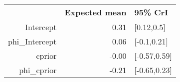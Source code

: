 \begin{tabular}{rrl}
  \hline
 & Expected mean & 95\% CrI \\ 
  \hline
Intercept & 0.31 & [0.12,0.5] \\ 
  phi\_Intercept & 0.06 & [-0.1,0.21] \\ 
  cprior & -0.00 & [-0.57,0.59] \\ 
  phi\_cprior & -0.21 & [-0.65,0.23] \\ 
   \hline
\end{tabular}

